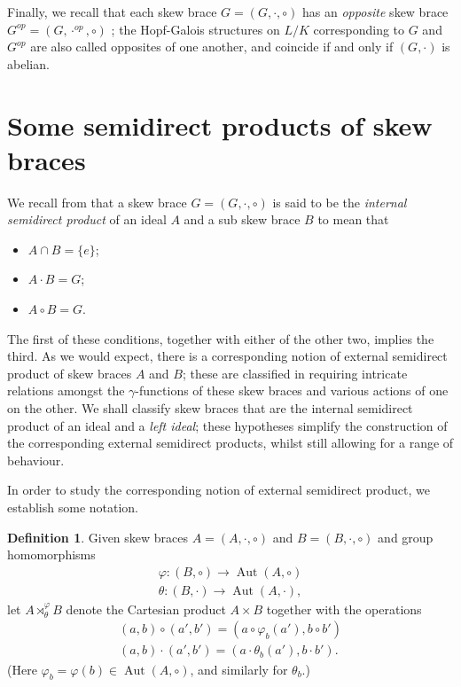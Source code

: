 \documentclass[12pt,a4paper, reqno]{amsart}
\theoremstyle{definition}
\newtheorem{definition}[theorem]{Definition}
\DeclareMathOperator{\Aut}{\mbox{Aut}}
\begin{document}
Finally, we recall that each skew brace $ G=(G,\cdot,\circ) $ has an \textit{opposite} skew brace $ G^{op}=(G,\cdot^{op},\circ) $ \cite{KT20}; the Hopf-Galois structures on $ L/K $ corresponding to $ G $ and $ G^{op} $ are also called opposites of one another, and coincide if and only if $ (G,\cdot) $ is abelian.


\section{Some semidirect products of skew braces} \label{sec_semidirect}

We recall from \cite[Proposition 2.2]{FP24} that a skew brace $ G=(G,\cdot,\circ) $ is said to be the \textit{internal semidirect product} of an ideal $ A $ and a sub skew brace $ B $ to mean that
\begin{itemize} 
\item $ A \cap B = \{ e \} $;
\item $ A \cdot B = G $;
\item $ A \circ B = G $.
\end{itemize}

The first of these conditions, together with either of the other two, implies the third. As we would expect, there is a corresponding notion of external semidirect product of skew braces $ A $ and $ B $; these are classified in \cite[Proposition 4.2]{FP24} requiring intricate relations amongst the $ \gamma $-functions of these skew braces and various actions of one on the other. We shall classify skew braces that are the internal semidirect product of an ideal and a \textit{left ideal}; these hypotheses simplify the construction of the corresponding external semidirect products, whilst still allowing for a range of behaviour. 

In order to study the corresponding notion of external semidirect product, we establish some notation. 

\begin{definition} \label{defn_external_SDP}
Given skew braces $ A=(A,\cdot,\circ) $ and $ B=(B,\cdot,\circ) $ and group homomorphisms
\begin{eqnarray*}
\varphi : (B,\circ) \rightarrow \Aut(A,\circ) \\
\theta : (B,\cdot) \rightarrow \Aut(A,\cdot),
\end{eqnarray*}
let $ A \rtimes_{\theta}^{\varphi} B $ denote the Cartesian product $ A \times B $ together with the operations
\begin{eqnarray*}
(a,b) \circ (a',b') = (a \circ \varphi_{b}(a'), b \circ b') \\
(a,b) \cdot (a',b') = (a \cdot \theta_{b}(a'), b \cdot b').
\end{eqnarray*}
(Here $ \varphi_{b} = \varphi(b) \in \Aut(A,\circ) $, and similarly for $ \theta_{b} $.)
\end{definition}
\end{document}
